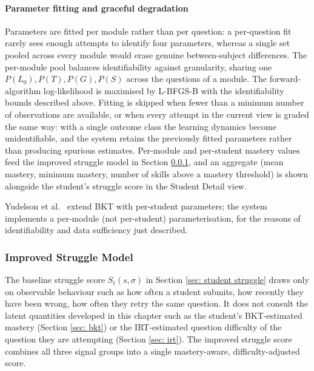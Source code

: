 \paragraph{Parameter fitting and graceful degradation}
Parameters are fitted per module rather than per question: a per-question fit rarely sees enough attempts to identify four parameters, whereas a single set pooled across every module would erase genuine between-subject differences. The per-module pool balances identifiability against granularity, sharing one $P(L_0), P(T), P(G), P(S)$ across the questions of a module. The forward-algorithm log-likelihood is maximised by L-BFGS-B with the identifiability bounds described above. 
Fitting is skipped when fewer than a minimum number of observations are available, or when every attempt in the current view is graded the same way: with a single outcome class the learning dynamics become unidentifiable, and the system retains the previously fitted parameters rather than producing spurious estimates. 
Per-module and per-student mastery values feed the improved struggle model in Section \ref{sec: improved struggle}, and an aggregate (mean mastery, minimum mastery, number of skills above a mastery threshold) is shown alongside the student's struggle score in the Student Detail view.

Yudelson et al.~\cite{yudelsonIndividualizedBayesianKnowledge2013} extend BKT with per-student parameters; the system implements a per-module (not per-student) parameterisation, for the reasons of identifiability and data sufficiency just described.

\subsubsection{Improved Struggle Model} \label{sec: improved struggle}
The baseline struggle score $S_t(s,\sigma)$ in Section \ref{sec: student struggle} draws only on observable behaviour such as how often a student submits, how recently they have been wrong, how often they retry the same question. 
It does not consult the latent quantities developed in this chapter such as the student's BKT-estimated mastery (Section \ref{sec: bkt}) or the IRT-estimated question difficulty of the question they are attempting (Section \ref{sec: irt}). 
The improved struggle score combines all three signal groups into a single mastery-aware, difficulty-adjusted score.


